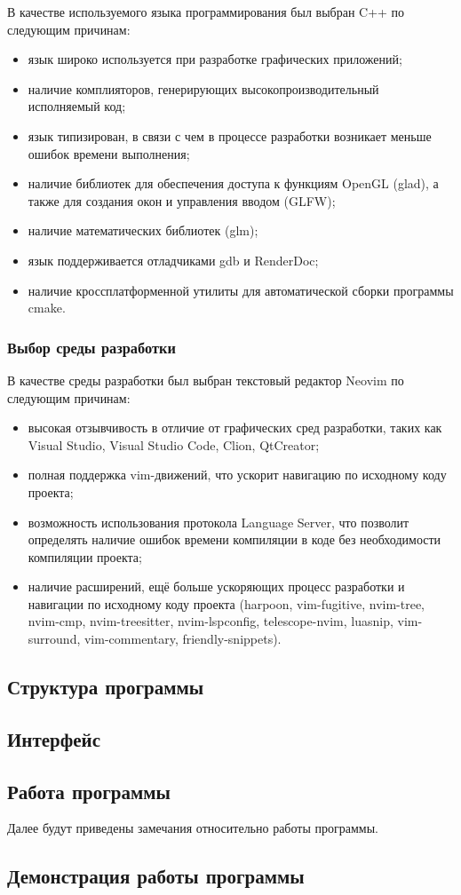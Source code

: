 В качестве используемого языка программирования был выбран C++ по следующим причинам:
\begin{itemize}
    \item язык широко используется при разработке графических приложений;
    \item наличие комплияторов, генерирующих высокопроизводительный исполняемый код;
    \item язык типизирован, в связи с чем в процессе разработки возникает меньше ошибок времени выполнения;
    \item наличие библиотек для обеспечения доступа к функциям OpenGL (glad), а также для создания окон и управления вводом (GLFW);
    \item наличие математических библиотек (glm);
    \item язык поддерживается отладчиками gdb и RenderDoc;
    \item наличие кроссплатформенной утилиты для автоматической сборки программы cmake.
\end{itemize}

\subsubsection{Выбор среды разработки}

В качестве среды разработки был выбран текстовый редактор Neovim по следующим причинам:
\begin{itemize}
    \item высокая отзывчивость в отличие от графических сред разработки, таких как Visual Studio, Visual Studio Code, Clion, QtCreator;
    \item полная поддержка vim-движений, что ускорит навигацию по исходному коду проекта;
    \item возможность использования протокола Language Server, что позволит определять наличие ошибок времени компиляции в коде без необходимости компиляции проекта;
    \item наличие расширений, ещё больше ускоряющих процесс разработки и навигации по исходному коду проекта (harpoon, vim-fugitive, nvim-tree, nvim-cmp, nvim-treesitter, nvim-lspconfig, telescope-nvim, luasnip, vim-surround, vim-commentary, friendly-snippets).
\end{itemize}

\subsection{Структура программы}

\subsection{Интерфейс}

\subsection{Работа программы}

Далее будут приведены замечания относительно работы программы.


\subsection{Демонстрация работы программы}
